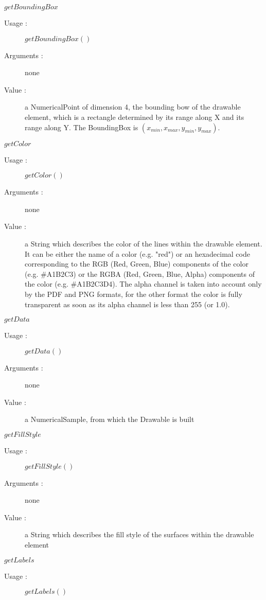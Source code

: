 \begin{description}
\begin{description}
  \item $getBoundingBox$
    \begin{description}
    \item[Usage :] $getBoundingBox()$
    \item[Arguments :] none
    \item[Value :] a NumericalPoint of dimension 4, the bounding bow of the drawable element, which is a rectangle determined by its range along X and its range along Y. The BoundingBox is $(x_{min}, x_{max}, y_{min}, y_{max})$.
    \end{description}
    \bigskip
  \item $getColor$
    \begin{description}
    \item[Usage :] $getColor()$
    \item[Arguments :] none
    \item[Value :] a String which describes the color of the lines within the drawable element. It can be either the name of a color (e.g. "red") or an hexadecimal code corresponding to the RGB (Red, Green, Blue) components of the color (e.g. \#A1B2C3) or the RGBA (Red, Green, Blue, Alpha) components of the color (e.g. \#A1B2C3D4). The alpha channel is taken into account only by the PDF and PNG formats, for the other format the color is fully transparent as soon as its alpha channel is less than 255 (or 1.0).
    \end{description}
    \bigskip
  \item $getData$
    \begin{description}
    \item[Usage :] $getData()$
    \item[Arguments :] none
    \item[Value :] a NumericalSample, from which the Drawable is built
    \end{description}
    \bigskip
  \item $getFillStyle$
    \begin{description}
    \item[Usage :] $getFillStyle()$
    \item[Arguments :] none
    \item[Value :] a String which describes the fill style of the surfaces within the drawable element
    \end{description}
    \bigskip
  \item $getLabels$
    \begin{description}
    \item[Usage :] $getLabels()$

\end{description}
\end{description}
\end{description}
